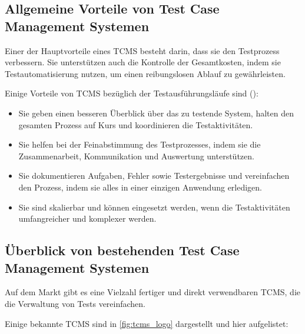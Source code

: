 \documentclass[a4paper, fontsize=11pt, parskip=half, twoside]{scrreprt}
\begin{document}
	
	\subsection{Allgemeine Vorteile von Test Case Management Systemen}
	Einer der Hauptvorteile eines \ac{TCMS} besteht darin, dass sie den Testprozess verbessern. 
	Sie unterstützen auch die Kontrolle der Gesamtkosten, indem sie Testautomatisierung nutzen, um einen reibungslosen Ablauf zu gewährleisten.  
	
	Einige Vorteile von \ac{TCMS} bezüglich der Testausführungsläufe sind (\textcite{lead_articles_nodate}):
	
	\begin{itemize}
		\item Sie geben einen besseren Überblick über das zu testende System, halten den gesamten Prozess auf Kurs und koordinieren die Testaktivitäten.
		\item Sie helfen bei der Feinabstimmung des Testprozesses, indem sie die Zusammenarbeit, Kommunikation und Auswertung unterstützen.
		\item Sie dokumentieren Aufgaben, Fehler sowie Testergebnisse und vereinfachen den Prozess, indem sie alles in einer einzigen Anwendung erledigen.
		\item Sie sind skalierbar und können eingesetzt werden, wenn die Testaktivitäten umfangreicher und komplexer werden.
	\end{itemize}
	
	
	\subsection{Überblick von bestehenden Test Case Management Systemen}
	Auf dem Markt gibt es eine Vielzahl fertiger und direkt verwendbaren \ac{TCMS}, die die Verwaltung von Tests vereinfachen.
	
	Einige bekannte \ac{TCMS} sind in \autoref{fig:tcms_logo} dargestellt und hier aufgelistet:
	
\end{document}
